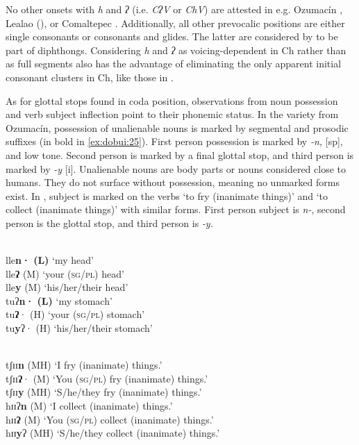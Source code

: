 \documentclass[output=paper]{langscibook}
\begin{document}
No other onsets with \textit{h} and \textit{ʔ} (i.e. \textit{CʔV} or \textit{ChV}) are attested in e.g. Ozumacín \citep{Rupp2012}, Lealao (\citealt{RuppRupp1996}), or Comaltepec \citep{AndersenEtAl2021}. Additionally, all other prevocalic positions are either single consonants or consonants and glides. The latter are considered by \citet[10]{Rupp2012} to be part of diphthongs. Considering \textit{h} and \textit{ʔ} as voicing-dependent in Ch rather than as full segments also has the advantage of eliminating the only apparent initial consonant clusters in Ch, like those in .

As for glottal stops found in coda position, observations from noun possession and verb subject inflection point to their phonemic status. In the variety from Ozumacín, possession of unalienable nouns is marked by segmental and prosodic suffixes (in bold in \ref{ex:dobui:25}). First person possession is marked by \textit{-n,} [sp], and low tone. Second person is marked by a final glottal stop, and third person is marked by \textit{-y} [i]. Unalienable nouns are body parts or nouns considered close to humans. They do not surface without possession, meaning no unmarked forms exist. In , subject is marked on the verbs ‘to fry (inanimate things)’ and ‘to collect (inanimate things)’ with similar forms. First person subject is \textit{n-}, second person is the glottal stop, and third person is \textit{-y.}

\ea\label{ex:dobui:25}
{\label{bkm:Ref133742628} \citet[235--236]{Rupp2012}}\\
\ea\label{ex:dobui:25a} lle\textbf{n}\textbf{·} \textbf{(L)} {‘my head’} \\
lle\textbf{ʔ} (M) {‘your (}\textsc{sg}{/}\textsc{pl}{) head’}\\
lle\textbf{y} (M) {‘his/her/their head’}\\
\ex\label{ex:dobui:25b} tuʔ\textbf{n·} \textbf{(L)} {‘my stomach’}\\
tu\textbf{ʔ}· (H) {‘your (}\textsc{sg}{/}\textsc{pl}{) stomach’}\\
tu\textbf{y}ʔ· (H) {‘his/her/their stomach’} \\
\z
\z

\ea\label{ex:dobui:26}
{\label{bkm:Ref133775649}\citet[248]{Rupp2012}}\\
\ea\label{ex:dobui:26a} tʃɪɪ\textbf{n} (MH) {‘I fry (inanimate) things.’}\\
tʃɪɪ\textbf{ʔ}{·} (M) {‘You (}\textsc{sg}{/}\textsc{pl}{) fry (inanimate) things.’}\\
tʃɪɪ\textbf{y} (MH) {‘S/he/they fry (inanimate) things.’}\\
\ex\label{ex:dobui:26b} hɪɪʔ\textbf{n} (M) {‘I collect (inanimate) things.’}\\
hɪɪ\textbf{ʔ} (M) {‘You (}\textsc{sg}{/}\textsc{pl}{) collect (inanimate) things.’}\\
hɪɪ\textbf{y}ʔ (MH) {‘S/he/they collect (inanimate) things.’}\\
\z
\z
\end{document}
